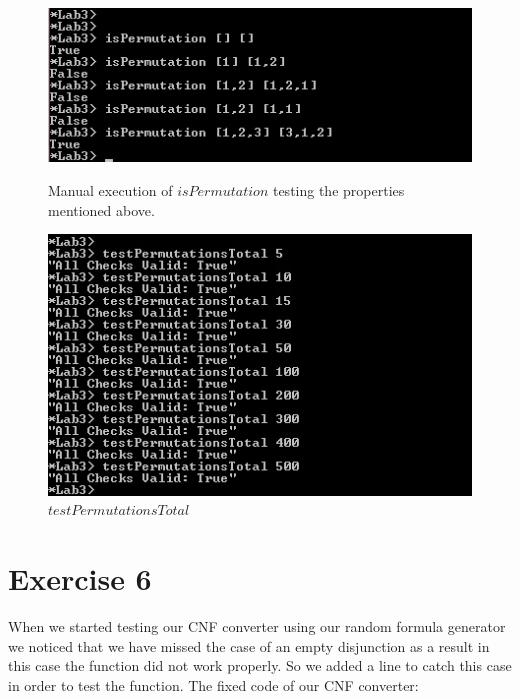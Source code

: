 \documentclass{article}
\begin{document}
\begin{figure}[ht]
\begin{minipage}[b]{0.5\linewidth}
\centering
\includegraphics[width=\textwidth]{isPermutation_manual.jpg}
\caption{Manual execution of $isPermutation$ testing the properties mentioned above.}
\label{fig:isPermutation}
\end{minipage}
\hspace{0.5cm}
\begin{minipage}[b]{0.5\linewidth}
\centering
\includegraphics[width=\textwidth]{testPermutationsTotal.jpg}
\caption{$testPermutationsTotal$}
\label{fig:testPermutationsTotal}
\end{minipage}
\end{figure}


\section*{Exercise 6}
When we started testing our CNF converter using our random formula generator we
noticed that we have missed the case of an empty disjunction as a result in
this case the function did not work properly. So we added a line to catch this
case in order to test the function. The fixed code of our CNF converter:
\end{document}
